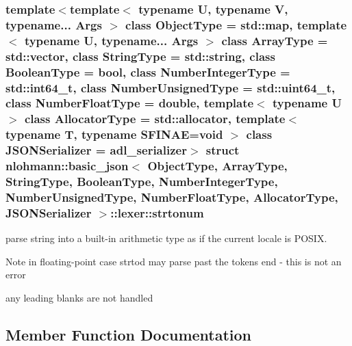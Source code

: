 \subsubsection*{template$<$template$<$ typename U, typename V, typename... Args $>$ class Object\+Type = std\+::map, template$<$ typename U, typename... Args $>$ class Array\+Type = std\+::vector, class String\+Type = std\+::string, class Boolean\+Type = bool, class Number\+Integer\+Type = std\+::int64\+\_\+t, class Number\+Unsigned\+Type = std\+::uint64\+\_\+t, class Number\+Float\+Type = double, template$<$ typename U $>$ class Allocator\+Type = std\+::allocator, template$<$ typename T, typename S\+F\+I\+N\+A\+E=void $>$ class J\+S\+O\+N\+Serializer = adl\+\_\+serializer$>$\newline
struct nlohmann\+::basic\+\_\+json$<$ Object\+Type, Array\+Type, String\+Type, Boolean\+Type, Number\+Integer\+Type, Number\+Unsigned\+Type, Number\+Float\+Type, Allocator\+Type, J\+S\+O\+N\+Serializer $>$\+::lexer\+::strtonum}

parse string into a built-\/in arithmetic type as if the current locale is P\+O\+S\+IX. 

\begin{DoxyNote}{Note}
in floating-\/point case strtod may parse past the token\textquotesingle{}s end -\/ this is not an error

any leading blanks are not handled 
\end{DoxyNote}


\subsection{Member Function Documentation}
\mbox{\label{structnlohmann_1_1basic__json_1_1lexer_1_1strtonum_af1b3dc99a67a854750437a60a22f4989}} 
